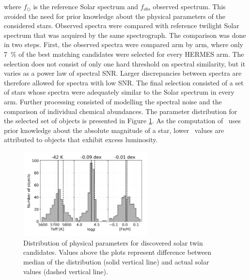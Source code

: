 where $f_{\odot}$ is the reference Solar spectrum and $f_{obs}$ observed spectrum. This avoided the need for prior knowledge about the physical parameters of the considered stars. Observed spectra were compared with reference twilight Solar spectrum that was acquired by the same spectrograph. The comparison was done in two steps. First, the observed spectra were compared arm by arm, where only 7~\% of the best matching candidates were selected for every HERMES arm. The selection does not consist of only one hard threshold on spectral similarity, but it varies as a power law of spectral SNR. Larger discrepancies between spectra are therefore allowed for spectra with low SNR. The final selection consisted of a set of stars whose spectra were adequately similar to the Solar spectrum in every arm. Further processing consisted of modelling the spectral noise and the comparison of individual chemical abundances. The parameter distribution for the selected set of objects is presented in Figure \ref{fig:twins_stats}. As the computation of \Logg\ uses prior knowledge about the absolute magnitude of a star, lower \Logg\ values are attributed to objects that exhibit excess luminosity. 

\begin{figure}
	\centering
	\includegraphics[width=0.6\textwidth]{solar_twins_like_07_ebv_c3.png}
	\caption{Distribution of physical parameters for discovered solar twin candidates. Values above the plots represent difference between median of the distribution (solid vertical line) and actual solar values (dashed vertical line).}
	\label{fig:twins_stats}
\end{figure}

